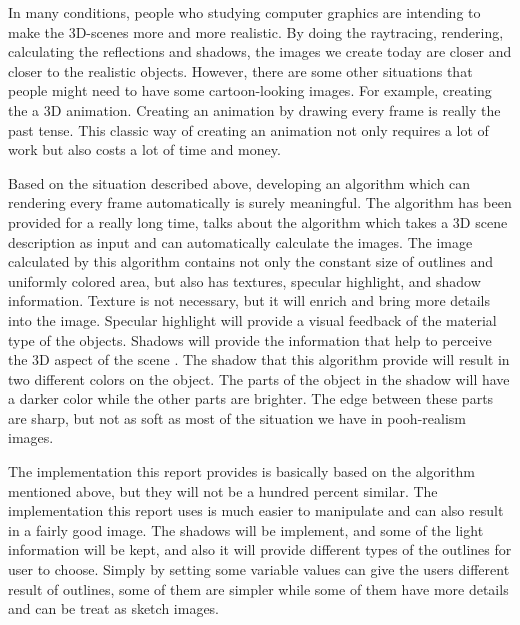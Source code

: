 \documentclass{acmsiggraph}               %
\begin{document}
In many conditions, people who studying computer graphics are intending to make the 3D-scenes more and more realistic. By doing the raytracing, rendering, calculating the reflections and shadows, the images we create today are closer and closer to the realistic objects. However, there are some other situations that people might need to have some cartoon-looking images. For example, creating the a 3D animation. Creating an animation by drawing every frame is really the past tense. This classic way of creating an animation not only requires a lot of work but also costs a lot of time and money. 

Based on the situation described above, developing an algorithm which can rendering every frame automatically is surely meaningful. The algorithm has been provided for a really long time, \cite{Decaudin:1996:CLR} talks about the algorithm which takes a 3D scene description as input and can automatically calculate the images. The image calculated by this algorithm contains not only the constant size of outlines and uniformly colored area, but also has textures, specular highlight, and shadow information. Texture is not necessary, but it will enrich and bring more details into the image. Specular highlight will provide a visual feedback of the material type of the objects. Shadows will provide the information that help to perceive the 3D aspect of the scene \cite{Decaudin:1996:CLR}. The shadow that this algorithm provide will result in two different colors on the object. The parts of the object in the shadow will have a darker color while the other parts are brighter. The edge between these parts are sharp, but not as soft as most of the situation we have in pooh-realism images.

The implementation this report provides is basically based on the algorithm mentioned above, but they will not be a hundred percent similar. The implementation this report uses is much easier to manipulate and can also result in a fairly good image. The shadows will be implement, and some of the light information will be kept, and also it will provide different types of the outlines for user to choose. Simply by setting some variable values can give the users different result of outlines, some of them are simpler while some of them have more details and can be treat as sketch images.
\end{document}
